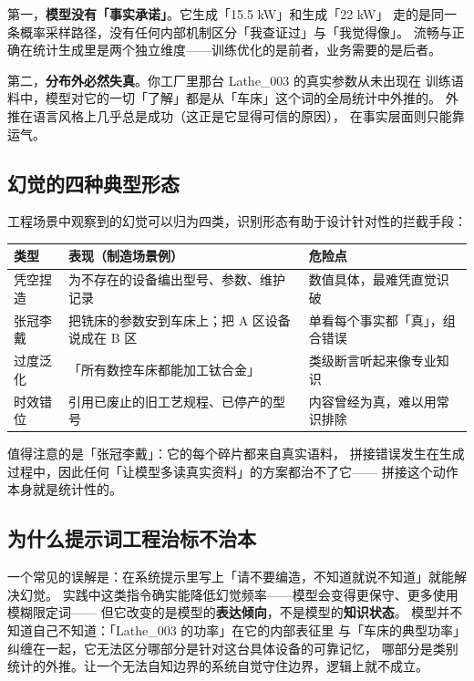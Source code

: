 第一，\textbf{模型没有「事实承诺」}。它生成「15.5 kW」和生成「22 kW」
走的是同一条概率采样路径，没有任何内部机制区分「我查证过」与「我觉得像」。
流畅与正确在统计生成里是两个独立维度——训练优化的是前者，业务需要的是后者。

第二，\textbf{分布外必然失真}。你工厂里那台 Lathe\_003 的真实参数从未出现在
训练语料中，模型对它的一切「了解」都是从「车床」这个词的全局统计中外推的。
外推在语言风格上几乎总是成功（这正是它显得可信的原因），
在事实层面则只能靠运气。

\subsection{幻觉的四种典型形态}

工程场景中观察到的幻觉可以归为四类，识别形态有助于设计针对性的拦截手段：

\begin{center}
\begin{tabularx}{\linewidth}{@{}lXX@{}}
\toprule
\textbf{类型} & \textbf{表现（制造场景例）} & \textbf{危险点} \\
\midrule
凭空捏造 & 为不存在的设备编出型号、参数、维护记录 & 数值具体，最难凭直觉识破 \\
张冠李戴 & 把铣床的参数安到车床上；把 A 区设备说成在 B 区 & 单看每个事实都「真」，组合错误 \\
过度泛化 & 「所有数控车床都能加工钛合金」 & 类级断言听起来像专业知识 \\
时效错位 & 引用已废止的旧工艺规程、已停产的型号 & 内容曾经为真，难以用常识排除 \\
\bottomrule
\end{tabularx}
\end{center}

值得注意的是「张冠李戴」：它的每个碎片都来自真实语料，
拼接错误发生在生成过程中，因此任何「让模型多读真实资料」的方案都治不了它——
拼接这个动作本身就是统计性的。

\subsection{为什么提示词工程治标不治本}

一个常见的误解是：在系统提示里写上「请不要编造，不知道就说不知道」就能解决幻觉。
实践中这类指令确实能降低幻觉频率——模型会变得更保守、更多使用模糊限定词——
但它改变的是模型的\textbf{表达倾向}，不是模型的\textbf{知识状态}。
模型并不知道自己不知道：「Lathe\_003 的功率」在它的内部表征里
与「车床的典型功率」纠缠在一起，它无法区分哪部分是针对这台具体设备的可靠记忆，
哪部分是类别统计的外推。让一个无法自知边界的系统自觉守住边界，逻辑上就不成立。

